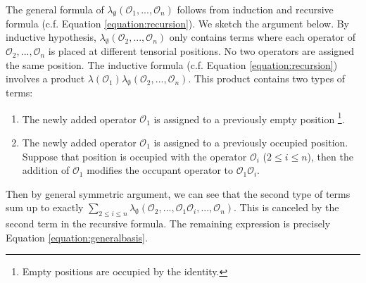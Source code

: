 \documentclass[a4paper,11pt]{article}
\theoremstyle{definition}
\numberwithin{equation}{section}
\begin{document}
The general formula of $\lambda_\emptyset(\mathcal{O}_1,...,\mathcal{O}_n)$ follows from induction and recursive formula (c.f. Equation \ref{equation:recursion}). We sketch the argument below. By inductive hypothesis, $\lambda_\emptyset(\mathcal{O}_2,...,\mathcal{O}_n)$ only contains terms where each operator of $\mathcal{O}_2,...,\mathcal{O}_n$ is placed at different tensorial positions. No two operators are assigned the same position. The inductive formula (c.f. Equation \ref{equation:recursion}) involves a product $\lambda(\mathcal{O}_1)\lambda_\emptyset(\mathcal{O}_2,...,\mathcal{O}_n)$. This product contains two types of terms:
\begin{enumerate}
    \item The newly added operator $\mathcal{O}_1$ is assigned to a previously empty position \footnote{Empty positions are occupied by the identity.}.
    \item The newly added operator $\mathcal{O}_1$ is assigned to a previously occupied position. Suppose that position is occupied with the operator $\mathcal{O}_i$ ($2\leq i\leq n$), then the addition of $\mathcal{O}_1$ modifies the occupant operator to $\mathcal{O}_1\mathcal{O}_i$.  
\end{enumerate}
Then by general symmetric argument, we can see that the second type of terms sum up to exactly $\sum_{2\leq i\leq n}\lambda_\emptyset(\mathcal{O}_2,...,\mathcal{O}_1\mathcal{O}_i,...,\mathcal{O}_n)$. This is canceled by the second term in the recursive formula. The remaining expression is precisely Equation \ref{equation:generalbasis}.
\end{document}
